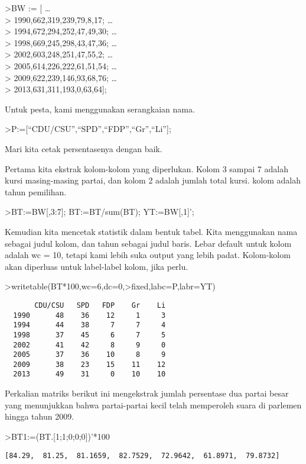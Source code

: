 \documentclass[
]{book}
\begin{document}
\textgreater BW := {[} \ldots{}\\
\textgreater{} 1990,662,319,239,79,8,17; \ldots{}\\
\textgreater{} 1994,672,294,252,47,49,30; \ldots{}\\
\textgreater{} 1998,669,245,298,43,47,36; \ldots{}\\
\textgreater{} 2002,603,248,251,47,55,2; \ldots{}\\
\textgreater{} 2005,614,226,222,61,51,54; \ldots{}\\
\textgreater{} 2009,622,239,146,93,68,76; \ldots{}\\
\textgreater{} 2013,631,311,193,0,63,64{]};

Untuk pesta, kami menggunakan serangkaian nama.

\textgreater P:={[}``CDU/CSU'',``SPD'',``FDP'',``Gr'',``Li''{]};

Mari kita cetak persentasenya dengan baik.

Pertama kita ekstrak kolom-kolom yang diperlukan. Kolom 3 sampai 7 adalah kursi masing-masing partai, dan kolom 2 adalah jumlah total kursi. kolom adalah tahun pemilihan.

\textgreater BT:=BW{[},3:7{]}; BT:=BT/sum(BT); YT:=BW{[},1{]}';

Kemudian kita mencetak statistik dalam bentuk tabel. Kita menggunakan nama sebagai judul kolom, dan tahun sebagai judul baris. Lebar default untuk kolom adalah wc = 10, tetapi kami lebih suka output yang lebih padat. Kolom-kolom akan diperluas untuk label-label kolom, jika perlu.

\textgreater writetable(BT*100,wc=6,dc=0,\textgreater fixed,labc=P,labr=YT)

\begin{verbatim}
       CDU/CSU   SPD   FDP    Gr    Li
  1990      48    36    12     1     3
  1994      44    38     7     7     4
  1998      37    45     6     7     5
  2002      41    42     8     9     0
  2005      37    36    10     8     9
  2009      38    23    15    11    12
  2013      49    31     0    10    10
\end{verbatim}

Perkalian matriks berikut ini mengekstrak jumlah persentase dua partai besar yang menunjukkan bahwa partai-partai kecil telah memperoleh suara di parlemen hingga tahun 2009.

\textgreater BT1:=(BT.{[}1;1;0;0;0{]})'*100

\begin{verbatim}
[84.29,  81.25,  81.1659,  82.7529,  72.9642,  61.8971,  79.8732]
\end{verbatim}
\end{document}
